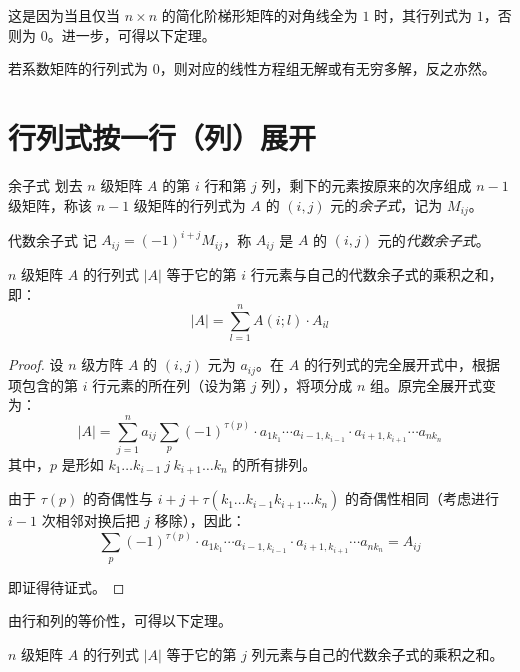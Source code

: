 这是因为当且仅当 $n \times n$ 的简化阶梯形矩阵的对角线全为 $1$ 时，其行列式为 $1$，否则为 $0$。进一步，可得以下定理。

\begin{theorem}
	若系数矩阵的行列式为 $0$，则对应的线性方程组无解或有无穷多解，反之亦然。
\end{theorem}

\section{行列式按一行（列）展开}

\begin{definition}{余子式}
	划去 $n$ 级矩阵 $A$ 的第 $i$ 行和第 $j$ 列，剩下的元素按原来的次序组成 $n - 1$ 级矩阵，称该 $n - 1$ 级矩阵的行列式为 $A$ 的 $(i, j)$ 元的\emph{余子式}，记为 $M_{ij}$。
\end{definition}

\begin{definition}{代数余子式}
	记 $A_{ij} = (-1)^{i + j} M_{ij}$，称 $A_{ij}$ 是 $A$ 的 $(i, j)$ 元的\emph{代数余子式}。
\end{definition}

\begin{theorem}
	$n$ 级矩阵 $A$ 的行列式 $|A|$ 等于它的第 $i$ 行元素与自己的代数余子式的乘积之和，即：
	$$
	|A| = \sum\limits_{l = 1}^n A(i; l) \cdot A_{il}
	$$
\end{theorem}

\begin{proof}
	设 $n$ 级方阵 $A$ 的 $(i, j)$ 元为 $a_{ij}$。在 $A$ 的行列式的完全展开式中，根据项包含的第 $i$ 行元素的所在列（设为第 $j$ 列），将项分成 $n$ 组。原完全展开式变为：
	$$
	|A| = \sum\limits_{j = 1}^n a_{ij} \sum\limits_{p} (-1)^{\tau(p)} \cdot a_{1 k_1} \cdots a_{i - 1, k_{i - 1}} \cdot a_{i + 1, k_{i + 1}} \cdots a_{n k_n}
	$$
	其中，$p$ 是形如 $k_1 \ldots k_{i - 1}~j~k_{i + 1} \ldots k_n$ 的所有排列。

	由于 $\tau(p)$ 的奇偶性与 $i + j + \tau(k_1 \ldots k_{i - 1} k_{i + 1} \ldots k_n)$ 的奇偶性相同（考虑进行 $i - 1$ 次相邻对换后把 $j$ 移除），因此：
	$$
	\sum\limits_{p} (-1)^{\tau(p)} \cdot a_{1 k_1} \cdots a_{i - 1, k_{i - 1}} \cdot a_{i + 1, k_{i + 1}} \cdots a_{n k_n} = A_{ij}
	$$

	即证得待证式。
\end{proof}

由行和列的等价性，可得以下定理。

\begin{theorem}
	$n$ 级矩阵 $A$ 的行列式 $|A|$ 等于它的第 $j$ 列元素与自己的代数余子式的乘积之和。
\end{theorem}


